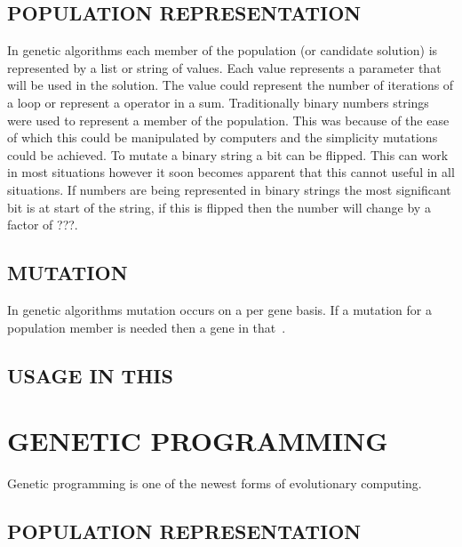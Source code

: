 \documentclass[10pt,twocolumn]{article}
\begin{document}
\subsection{POPULATION REPRESENTATION}
In genetic algorithms each member of the population (or candidate solution) is represented by a list or string of values.
Each value represents a parameter that will be used in the solution.
The value could represent the number of iterations of a loop or represent a operator in a sum.
Traditionally binary numbers strings were used to represent a member of the population.
This was because of the ease of which this could be manipulated by computers and the simplicity mutations could be achieved.
To mutate a binary string a bit can be flipped.
This can work in most situations however it soon becomes apparent that this cannot useful in all situations.
If numbers are being represented in binary strings the most significant bit is at start of the string, if this is flipped then the number will change by a factor of ???.


\subsection{MUTATION}
In genetic algorithms mutation occurs on a per gene basis. If a mutation for a population member is needed then a gene in that~\cite{j1}. 

\subsection{USAGE IN THIS}

\section{GENETIC PROGRAMMING}
Genetic programming is one of the newest forms of evolutionary computing. 


\subsection{POPULATION REPRESENTATION}
\end{document}
